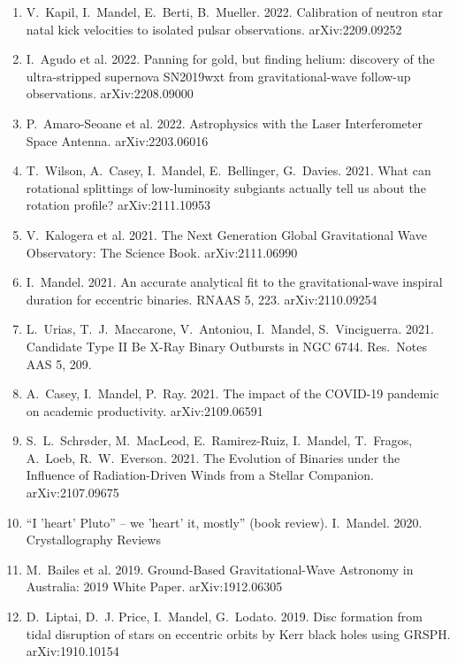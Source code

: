 \documentclass[margin,line]{res}
\begin{document}
\begin{resume}
\begin{enumerate}
\item V.~Kapil, I.~Mandel, E.~Berti, B.~Mueller.  2022.  Calibration of neutron star natal kick velocities to isolated pulsar observations. arXiv:2209.09252

\item I.~Agudo et al. 2022.  Panning for gold, but finding helium: discovery of the ultra-stripped supernova SN2019wxt from gravitational-wave follow-up observations.  arXiv:2208.09000

\item P.~Amaro-Seoane et al. 2022. Astrophysics with the Laser Interferometer Space Antenna. arXiv:2203.06016

\item T.~Wilson, A.~Casey, I.~Mandel, E.~Bellinger, G.~Davies.  2021.  What can rotational splittings of low-luminosity subgiants actually tell us about the rotation profile?  arXiv:2111.10953

\item V.~Kalogera et al.  2021. The Next Generation Global Gravitational Wave Observatory: The Science Book.  arXiv:2111.06990

\item I.~Mandel.  2021.  An accurate analytical fit to the gravitational-wave inspiral duration for eccentric binaries. RNAAS 5, 223. arXiv:2110.09254

\item L.~Urias, T.~J.~Maccarone, V.~Antoniou, I.~Mandel, S.~Vinciguerra.  2021.  Candidate Type II Be X-Ray Binary Outbursts in NGC 6744.  Res.~Notes AAS 5, 209.

\item A.~Casey, I.~Mandel, P.~Ray. 2021. The impact of the COVID-19 pandemic on academic productivity.  arXiv:2109.06591

\item S.~L.~Schr{\o}der, M.~MacLeod, E.~Ramirez-Ruiz, I.~Mandel, T.~Fragos, A.~Loeb, R.~W.~Everson. 2021. The Evolution of Binaries under the Influence of Radiation-Driven Winds
  from a Stellar Companion.  arXiv:2107.09675

\item ``I 'heart' Pluto'' -- we 'heart' it, mostly'' (book review).  I.~Mandel.  2020.  Crystallography Reviews

\item M.~Bailes et al. 2019. Ground-Based Gravitational-Wave Astronomy in Australia: 2019 White Paper. arXiv:1912.06305

\item D.~Liptai, D.~J. Price, I.~Mandel, G.~Lodato.  2019.  Disc formation from tidal disruption of stars on eccentric orbits by Kerr black holes using GRSPH.  arXiv:1910.10154


\end{enumerate}
\end{resume}
\end{document}
